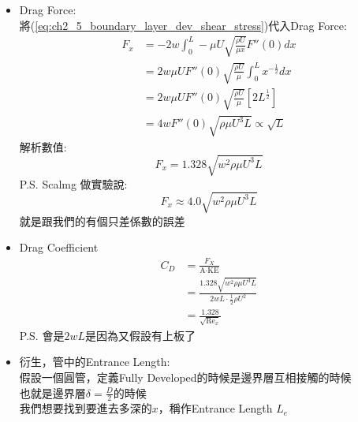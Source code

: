 \documentclass[../main.tex]{subfiles}
\begin{document}
\begin{itemize}
\begin{itemize}
\begin{enumerate}
\begin{itemize}
      積分得到:
      \begin{equation}
        u_y = 0.166 \sqrt{\frac{\rho U^3}{\mu x^3}} \frac{y^2}{2} + H(x) = 0.083 \sqrt{\frac{\rho U^3}{\mu x^3}} y^2 + H(x)
      \end{equation}
      由於$u_y(x,0) = 0$，所以$H(x) = 0$
      \begin{equation}
        \boxed{u_y = 0.083 \sqrt{\frac{\rho U^3}{\mu x^3}} y^2} \label{eq:ch2_5_boundary_layer_dev_velocity_profile_u_y}
      \end{equation}
      \item Drag Force:\\
      將(\ref{eq:ch2_5_boundary_layer_dev_shear_stress})代入Drag Force:
      \begin{align}
        F_x &= -2w \int_0^L -\mu U \sqrt{\frac{\rho U}{\mu x}} F''(0) dx \nonumber\\
        &= 2w \mu U F''(0) \sqrt{\frac{\rho U}{\mu}} \int_0^L x^{-\frac{1}{2}} dx \nonumber\\
        &= 2w \mu U F''(0) \sqrt{\frac{\rho U}{\mu}} \left[
          2L^{\frac{1}{2}}
        \right] \nonumber\\
        &= 4w F''(0) \sqrt{\rho \mu U^3 L} \propto \sqrt{L}
      \end{align}
      解析數值:
      \begin{equation}
        F_x = 1.328 \sqrt{w^2 \rho \mu U^3 L}
      \end{equation}
      P.S. Scalmg 做實驗說:
      \begin{equation}
        F_x \approx 4.0 \sqrt{w^2 \rho \mu U^3 L}
      \end{equation}
      就是跟我們的有個只差係數的誤差
      \item Drag Coefficient
      \begin{align}
        C_D &= \frac{F_X}{\text{A}\cdot \text{KE}} \nonumber\\
        &= \frac{1.328 \sqrt{w^2 \rho \mu U^3 L}}{2wL \cdot \frac{1}{2}\rho U^2} \nonumber\\
        &= \frac{1.328}{\sqrt{\text{Re}_x}} 
      \end{align}
      P.S. 會是$2wL$是因為又假設有上板了
      \item 衍生，管中的Entrance Length:\\
      假設一個圓管，定義Fully Developed的時候是邊界層互相接觸的時候\\
      也就是邊界層$\delta = \frac{D}{2}$的時候\\
      我們想要找到要進去多深的$x$，稱作Entrance Length $L_e$\\

\end{itemize}
\end{enumerate}
\end{itemize}
\end{itemize}
\end{document}
